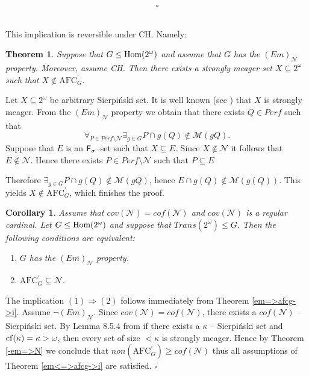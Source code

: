 \documentclass[b5cutpaper, twoside, 11pt, leqno]{moravica}
\newcommand{\afc}{\mathrm{AFC}}
\newcommand{\afcp}{\afc^\prime}
\newcommand\afcg{\afcp_{G}}
\newcommand\trans{\mathit{Trans}(\ca)}
\newcommand\ooo{\underline{O}}
\newcommand{\seq}{\subseteq}
\newcommand{\ca}{2^{\omega}}
\newcommand{\mgr}{\mathcal{M}}
\newcommand{\neglig}{\mathcal{N}}
\newcommand{\oo}{\omega}
\newcommand{\perf}{\mathit{Perf}}
\newcommand{\fsigma}{{\sf F}_{\sigma}}
\newcommand{\cof}{\mathit{cof}}
\newcommand{\cov}{\mathit{cov}}
\newcommand{\non}{\mathit{non}}
\newcommand\Hom{{\rm Hom(\ca)}}
\newcommand{\cf}{{\rm cf}}
\newtheorem{theorem}{Theorem}[section]
\newtheorem{corollary}{Corollary}[section]
\theoremstyle{definition}
\begin{document}

$$\square$$

 \\

This implication is reversible
under CH. Namely:

\begin{theorem}
Suppose that $G \leq \Hom$ and assume that $G$ has the $(Em)_{\neglig}$
property. Moreover, assume CH. Then there exists a strongly
meager set $X\seq\ca$ such that $X \not\in \afcg$.
\end{theorem}


\proof

  Let $X\seq\ca$ be arbitrary Sierpi\'nski set.
It is well known (see \cite{P}) that $X$ is
strongly meager.
  From the $(Em)_{\neglig}$ property we obtain that
there exists $Q \in \perf$ such that
  \[
    \forall_{P \in \perf \setminus \neglig}
    \exists_{g \in G} P \cap g(Q) \not\in \mgr(gQ).
  \]
Suppose that $E$ is an $\fsigma$--set such that $X \seq E$.
Since $X \not \in \neglig$ it follows that $E \not \in \neglig$.
  Hence there exists $P \in \perf \setminus \neglig $ such that
$P \seq E$

Therefore $\exists_{g \in G} P \cap g(Q) \not\in \mgr(gQ)$,
hence $E \cap g(Q) \not\in \mgr(g(Q))$.
  This yields $X \not\in \afcg$, which finishes the proof.

\begin{corollary}
\label{corollary_1}
  Assume that $\cov(\neglig) = \cof(\neglig)$ and
$\cov(\neglig)$ is a regular cardinal.
  Let $G \leq \Hom$ and suppose that $\trans \leq G$.
Then the following conditions are equivalent:

  \begin{enumerate}
  \item
    $G$ has the $(Em)_{\neglig}$ property.

  \item
    $\afcg \seq \neglig$.

  \end{enumerate}
\end{corollary}

\proof
  The implication $(1) \Rightarrow (2)$ follows immediately
from Theorem \ref{em=>afcg->i}.
  Assume $\neg (Em)_{\neglig}$. Since $\cov(\neglig) = \cof(\neglig)$,
there exists a $\cof(\neglig)$ -- Sierpi\'nski set.
  By Lemma 8.5.4 from \cite{BJ}
if there exists a $\kappa$ -- Sierpi\'nski set
and $\cf(\kappa) = \kappa > \oo$,
then every set of size $< \kappa$ is strongly meager.
  Hence by Theorem \ref{-em=>N} we conclude that
$\non(\afcg) \geq \cof(\neglig)$
thus all assumptions of Theorem \ref{em<=>afcg->i} are satisfied.
  $\square$
\end{document}

